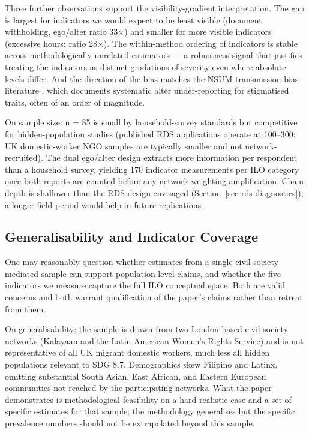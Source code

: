 \documentclass[
  12pt,
  letterpaper,
  DIV=11,
  numbers=noendperiod]{scrartcl}
\begin{document}
Three further observations support the visibility-gradient
interpretation. The gap is largest for indicators we would expect to be
least visible (document withholding, ego/alter ratio 33\(\times\)) and
smaller for more visible indicators (excessive hours: ratio
28\(\times\)). The within-method ordering of indicators is stable across
methodologically unrelated estimators --- a robustness signal that
justifies treating the indicators as distinct gradations of severity
even where absolute levels differ. And the direction of the bias matches
the NSUM transmission-bias literature
\autocite{kill98-social,malt15-estimating,feeh16-generalizing}, which
documents systematic alter under-reporting for stigmatised traits, often
of an order of magnitude.

On sample size: n = 85 is small by household-survey standards but
competitive for hidden-population studies (published RDS applications
operate at 100--300; UK domestic-worker NGO samples are typically
smaller and not network-recruited). The dual ego/alter design extracts
more information per respondent than a household survey, yielding 170
indicator measurements per ILO category once both reports are counted
before any network-weighting amplification. Chain depth is shallower
than the RDS design envisaged (Section~\ref{sec-rds-diagnostics}); a
longer field period would help in future replications.

\subsection{Generalisability and Indicator
Coverage}\label{sec-generalisability}

One may reasonably question whether estimates from a single
civil-society-mediated sample can support population-level claims, and
whether the five indicators we measure capture the full ILO conceptual
space. Both are valid concerns and both warrant qualification of the
paper's claims rather than retreat from them.

On generalisability: the sample is drawn from two London-based
civil-society networks (Kalayaan and the Latin American Women's Rights
Service) and is not representative of all UK migrant domestic workers,
much less all hidden populations relevant to SDG 8.7. Demographics skew
Filipino and Latinx, omitting substantial South Asian, East African, and
Eastern European communities not reached by the participating networks.
What the paper demonstrates is methodological feasibility on a hard
realistic case and a set of specific estimates for that sample; the
methodology generalises but the specific prevalence numbers should not
be extrapolated beyond this sample.
\end{document}
